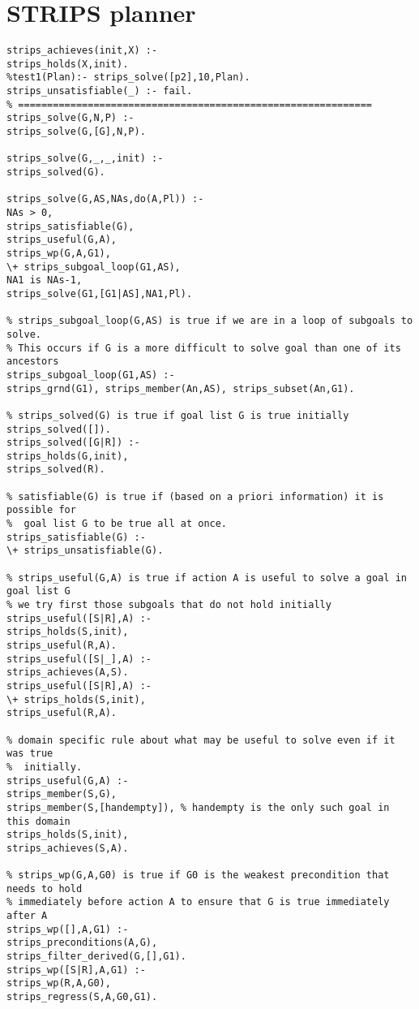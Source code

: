 \chapter{STRIPS planner} %

\label{AppendixB} %

\begin{lstlisting}
strips_achieves(init,X) :-
strips_holds(X,init).
%test1(Plan):- strips_solve([p2],10,Plan).
strips_unsatisfiable(_) :- fail.
% =============================================================
strips_solve(G,N,P) :-
strips_solve(G,[G],N,P).

strips_solve(G,_,_,init) :-
strips_solved(G).

strips_solve(G,AS,NAs,do(A,Pl)) :-
NAs > 0,
strips_satisfiable(G),
strips_useful(G,A),
strips_wp(G,A,G1),
\+ strips_subgoal_loop(G1,AS),
NA1 is NAs-1,
strips_solve(G1,[G1|AS],NA1,Pl).

% strips_subgoal_loop(G,AS) is true if we are in a loop of subgoals to solve.
% This occurs if G is a more difficult to solve goal than one of its ancestors
strips_subgoal_loop(G1,AS) :-
strips_grnd(G1), strips_member(An,AS), strips_subset(An,G1).

% strips_solved(G) is true if goal list G is true initially
strips_solved([]).
strips_solved([G|R]) :-
strips_holds(G,init),
strips_solved(R).

% satisfiable(G) is true if (based on a priori information) it is possible for
%  goal list G to be true all at once.
strips_satisfiable(G) :-
\+ strips_unsatisfiable(G).

% strips_useful(G,A) is true if action A is useful to solve a goal in goal list G
% we try first those subgoals that do not hold initially
strips_useful([S|R],A) :-
strips_holds(S,init),
strips_useful(R,A).
strips_useful([S|_],A) :-
strips_achieves(A,S).
strips_useful([S|R],A) :-
\+ strips_holds(S,init),
strips_useful(R,A).

% domain specific rule about what may be useful to solve even if it was true
%  initially. 
strips_useful(G,A) :-
strips_member(S,G),
strips_member(S,[handempty]), % handempty is the only such goal in this domain
strips_holds(S,init),
strips_achieves(S,A).

% strips_wp(G,A,G0) is true if G0 is the weakest precondition that needs to hold
% immediately before action A to ensure that G is true immediately after A
strips_wp([],A,G1) :-
strips_preconditions(A,G),
strips_filter_derived(G,[],G1).
strips_wp([S|R],A,G1) :-
strips_wp(R,A,G0),
strips_regress(S,A,G0,G1).


\end{lstlisting}

